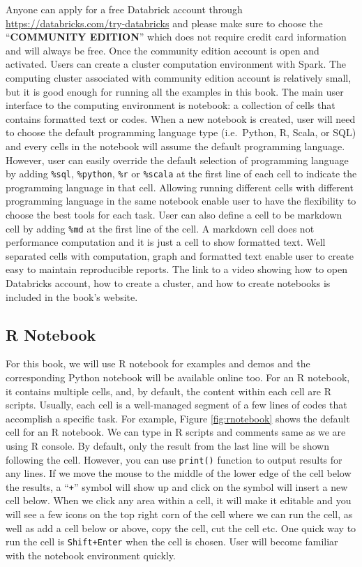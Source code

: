 \documentclass[
  12pt,
]{krantz}
\begin{document}
Anyone can apply for a free Databrick account through \url{https://databricks.com/try-databricks} and please make sure to choose the ``\textbf{COMMUNITY EDITION}'' which does not require credit card information and will always be free. Once the community edition account is open and activated. Users can create a cluster computation environment with Spark. The computing cluster associated with community edition account is relatively small, but it is good enough for running all the examples in this book. The main user interface to the computing environment is notebook: a collection of cells that contains formatted text or codes. When a new notebook is created, user will need to choose the default programming language type (i.e.~Python, R, Scala, or SQL) and every cells in the notebook will assume the default programming language. However, user can easily override the default selection of programming language by adding \texttt{\%sql}, \texttt{\%python}, \texttt{\%r} or \texttt{\%scala} at the first line of each cell to indicate the programming language in that cell. Allowing running different cells with different programming language in the same notebook enable user to have the flexibility to choose the best tools for each task. User can also define a cell to be markdown cell by adding \texttt{\%md} at the first line of the cell. A markdown cell does not performance computation and it is just a cell to show formatted text. Well separated cells with computation, graph and formatted text enable user to create easy to maintain reproducible reports. The link to a video showing how to open Databricks account, how to create a cluster, and how to create notebooks is included in the book's website.

\hypertarget{r-notebook}{%
\subsection{R Notebook}\label{r-notebook}}

For this book, we will use R notebook for examples and demos and the corresponding Python notebook will be available online too. For an R notebook, it contains multiple cells, and, by default, the content within each cell are R scripts. Usually, each cell is a well-managed segment of a few lines of codes that accomplish a specific task. For example, Figure \ref{fig:rnotebook} shows the default cell for an R notebook. We can type in R scripts and comments same as we are using R console. By default, only the result from the last line will be shown following the cell. However, you can use \texttt{print()} function to output results for any lines. If we move the mouse to the middle of the lower edge of the cell below the results, a ``\texttt{+}'' symbol will show up and click on the symbol will insert a new cell below. When we click any area within a cell, it will make it editable and you will see a few icons on the top right corn of the cell where we can run the cell, as well as add a cell below or above, copy the cell, cut the cell etc. One quick way to run the cell is \texttt{Shift+Enter} when the cell is chosen. User will become familiar with the notebook environment quickly.
\end{document}
